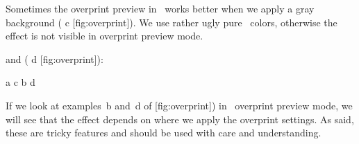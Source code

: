 \typebuffer[b]

Sometimes the overprint preview in \ACROBAT\ works better when we apply a gray
background ( {c} [fig:overprint]). We use rather ugly pure \CMYK\
colors, otherwise the effect is not visible in overprint preview mode.

\startbuffer[c]
\framed
  [background=color,backgroundcolor=ogray,backgroundoffset=.25em,
   frame=off,offset=overlay]
  {\getbuffer[a]}
\stopbuffer

\typebuffer[c]

and ( {d} [fig:overprint]):

\startbuffer[d]
\framed
  [background=color,backgroundcolor=ogray,backgroundoffset=.25em,
   frame=off,offset=overlay]
  {\getbuffer[b]}
\stopbuffer

\typebuffer[d]

\startbuffer
\startcombination[2*2]
  {\getbuffer[a]} {a}
  {\getbuffer[c]} {c}
  {\getbuffer[b]} {b}
  {\getbuffer[d]} {d}
\stopcombination
\stopbuffer

  {\getbuffer}

If we look at examples~b and~d of  [fig:overprint]) in \ACROBAT\
overprint preview mode, we will see that the effect depends on where we apply the
overprint settings. As said, these are tricky features and should be used with
care and understanding.

\stopdocument
